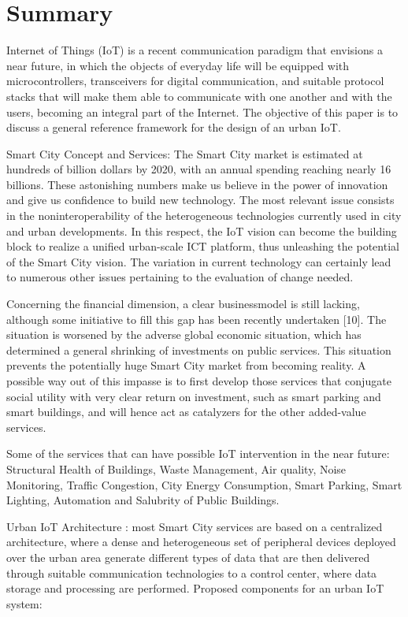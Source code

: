\section{Summary}
Internet of Things (IoT) is a recent communication paradigm that envisions a near future, in which the objects of everyday life will be equipped with microcontrollers, transceivers for digital communication, and suitable protocol stacks that will make them able to communicate with one another and with the users, becoming an integral part of the Internet.
The objective of this paper is to discuss a general reference framework for the design of an urban IoT.

Smart City Concept and Services:
The Smart City market is estimated at hundreds of billion dollars by 2020, with an annual spending reaching nearly 16 billions. These astonishing numbers make us believe in the power of innovation and give us confidence to build new technology.
The most relevant issue consists in the noninteroperability of the heterogeneous technologies currently used in city and urban developments. In this respect, the IoT vision can become the building block to realize a unified urban-scale ICT platform, thus unleashing the potential of the Smart City vision. The variation in current technology can certainly lead to numerous other issues pertaining to the evaluation of change needed.

Concerning the financial dimension, a clear businessmodel is still lacking, although some initiative to fill this gap has been recently undertaken [10]. The situation is worsened by the adverse global economic situation, which has determined a general shrinking of investments on public services. This situation prevents the potentially huge Smart City market from becoming reality. A possible way out of this impasse is to first develop those services that conjugate social utility with very clear return on investment, such as smart parking and smart buildings, and will hence act as catalyzers for the other added-value services.

Some of the services that can have possible IoT intervention in the near future:
Structural Health of Buildings, Waste Management, Air quality, Noise Monitoring, Traffic Congestion, City Energy Consumption, Smart Parking, Smart Lighting, Automation and Salubrity of Public Buildings.

Urban IoT Architecture : most Smart City services are based on a centralized architecture, where a dense and heterogeneous set of peripheral devices deployed over the urban area generate different types of data that are then delivered through suitable communication technologies to a control center, where data storage and processing are performed.
Proposed components for an urban IoT system:

